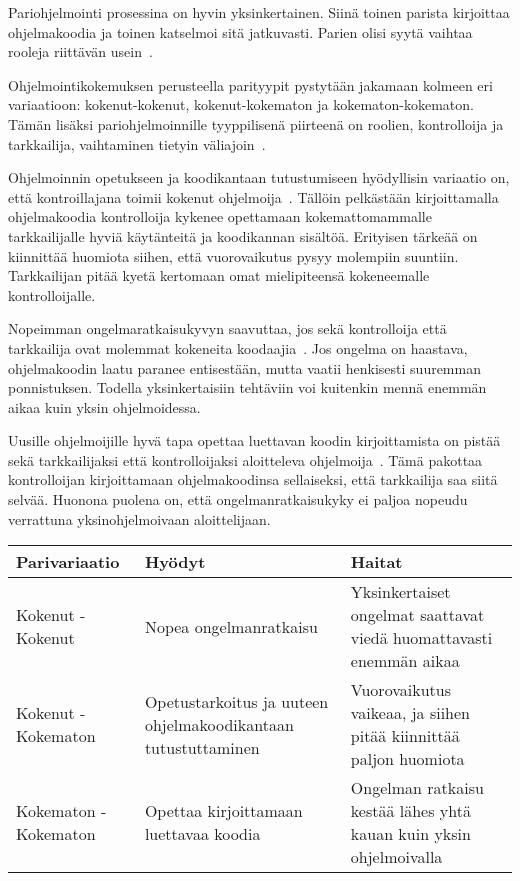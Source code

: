 \documentclass[finnish]{tktltiki2}
\theoremstyle{definition}
\theoremstyle{remark}
\begin{document}
Pariohjelmointi prosessina on hyvin yksinkertainen. Siinä toinen parista kirjoittaa ohjelmakoodia ja toinen katselmoi sitä jatkuvasti. Parien olisi syytä vaihtaa rooleja riittävän usein~\cite{beck00extreme}. 

Ohjelmointikokemuksen perusteella parityypit pystytään jakamaan kolmeen eri variaatioon: kokenut-kokenut, kokenut-kokematon ja kokematon-kokematon. Tämän lisäksi pariohjelmoinnille tyyppilisenä piirteenä on roolien, kontrolloija ja tarkkailija, vaihtaminen tietyin väliajoin~\cite{williams02support}.

Ohjelmoinnin opetukseen ja koodikantaan tutustumiseen hyödyllisin variaatio on, että kontroillajana toimii kokenut ohjelmoija~\cite{chong2007social}. Tällöin pelkästään kirjoittamalla ohjelmakoodia kontrolloija kykenee opettamaan kokemattomammalle tarkkailijalle hyviä käytänteitä ja koodikannan sisältöä. Erityisen tärkeää on kiinnittää huomiota siihen, että vuorovaikutus pysyy molempiin suuntiin. Tarkkailijan pitää kyetä kertomaan omat mielipiteensä kokeneemalle kontrolloijalle.

Nopeimman ongelmaratkaisukyvyn saavuttaa, jos sekä kontrolloija että tarkkailija ovat molemmat kokeneita koodaajia~\cite{voas2001faster}. Jos ongelma on haastava, ohjelmakoodin laatu paranee entisestään,  mutta vaatii henkisesti suuremman ponnistuksen. Todella yksinkertaisiin tehtäviin voi kuitenkin mennä enemmän aikaa kuin yksin ohjelmoidessa.

Uusille ohjelmoijille hyvä tapa opettaa luettavan koodin kirjoittamista on pistää sekä tarkkailijaksi että kontrolloijaksi aloitteleva ohjelmoija~\cite{chong2007social}. Tämä pakottaa kontrolloijan kirjoittamaan ohjelmakoodinsa sellaiseksi, että tarkkailija saa siitä selvää. Huonona puolena on, että ongelmanratkaisukyky ei paljoa nopeudu verrattuna yksinohjelmoivaan aloittelijaan.

\begin{center}
    \begin{tabular}{ | p{} | p{5cm} | p{4cm} | }
    \hline
   	Parivariaatio & Hyödyt & Haitat \\ \hline
    	Kokenut - Kokenut & Nopea ongelmanratkaisu & Yksinkertaiset ongelmat saattavat viedä huomattavasti enemmän aikaa\\ \hline
	Kokenut - Kokematon & Opetustarkoitus ja uuteen ohjelmakoodikantaan tutustuttaminen & Vuorovaikutus vaikeaa, ja siihen pitää kiinnittää paljon huomiota\\ \hline
	Kokematon - Kokematon & Opettaa kirjoittamaan luettavaa koodia & Ongelman ratkaisu kestää lähes yhtä kauan kuin yksin ohjelmoivalla \\ \hline
    \end{tabular}
\end{center}
\end{document}
